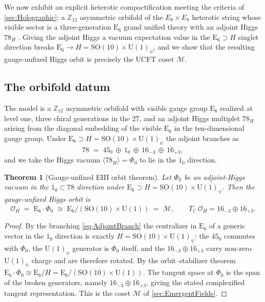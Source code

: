 \documentclass[pdflatex,sn-mathphys-num]{sn-jnl}
\theoremstyle{thmstyleone}
\newtheorem{theorem}{Theorem}
\theoremstyle{thmstyletwo}%
\theoremstyle{thmstylethree}%
\newcommand{\SO}[1]{\mathrm{SO(#1)}}
\newcommand{\U}[1]{\mathrm{U(#1)}}
\newcommand{\E}[1]{\mathrm{E_{#1}}}
\newcommand{\M}{\mathcal{M}}
\newcommand{\SOTen}{\SO{10}}
\newcommand{\UOne}{\U{1}}
\newcommand{\ESix}{\E{6}}
\newcommand{\SOTenXUOne}{\SOTen \times \UOne}
\newcommand{\MCosetInline}{\ESix/(\SOTenXUOne)}
\begin{document}
We now exhibit an explicit heterotic compactification meeting the criteria of
\autoref{sec:Holographic}: a $\mathbb Z_{12}$ asymmetric orbifold of the
$E_{8}\times E_{8}$ heterotic string \cite{DHVW:1985,Narain:1986} whose visible
sector is a three-generation $\ESix$ grand unified theory with an adjoint Higgs
$78_{H}$ \cite{Z12Heterotic}.  Giving the adjoint Higgs a vacuum expectation
value in the $\ESix\supset H$ singlet direction breaks $\ESix\to H=\SOTenXUOne_\psi$,
and we show that the resulting gauge-unfixed Higgs orbit is precisely the UCFT
coset $\M$.

\subsection{The orbifold datum}

The model is a $\mathbb Z_{12}$ asymmetric orbifold with visible gauge group
$\ESix$ realized at level one, three chiral generations in the $27$, and an
adjoint Higgs multiplet $78_{H}$ arising from the diagonal embedding of the
visible $\ESix$ in the ten-dimensional gauge group.  Under
$\ESix\supset H=\SOTenXUOne_\psi$ the adjoint branches as
\begin{equation}
  78 \;=\; 45_{0}\,\oplus\,1_{0}\,\oplus\,16_{-3}\,\oplus\,\overline{16}_{+3},
  \label{eq:AdjointBranch}
\end{equation}
and we take the Higgs vacuum $\langle78_{H}\rangle=\Phi_{0}$ to lie in the
$1_{0}$ direction.

\begin{theorem}[Gauge-unfixed EIII orbit theorem]
\label{thm:Z12Orbit}
Let $\Phi_{0}$ be an adjoint-Higgs vacuum in the $1_{0}\subset78$ direction under
$\ESix\supset H=\SOTenXUOne_\psi$.  Then the gauge-unfixed Higgs orbit is
\[
  \mathcal O_{H}
  \;=\;\ESix\cdot\Phi_{0}
  \;\cong\;\MCosetInline
  \;=\;\M,
  \qquad
  T_{\mathbb C}\,\mathcal O_{H}=16_{-3}\oplus\overline{16}_{+3}.
\]
\end{theorem}

\begin{proof}
By the branching \eqref{eq:AdjointBranch} the centralizer in $\ESix$ of a
generic vector in the $1_{0}$ direction is exactly $H=\SOTenXUOne_\psi$: the
$45_{0}$ commutes with $\Phi_{0}$, the $\UOne_\psi$ generator is $\Phi_{0}$
itself, and the $16_{-3}\oplus\overline{16}_{+3}$ carry non-zero $\UOne_\psi$
charge and are therefore rotated.  By the orbit--stabilizer theorem
$\ESix\cdot\Phi_{0}\cong\ESix/H=\MCosetInline$.  The tangent space at $\Phi_{0}$
is the span of the broken generators, namely
$16_{-3}\oplus\overline{16}_{+3}$, giving the stated complexified tangent
representation.  This is the coset $\M$ of \autoref{sec:EmergentFields}.
\end{proof}
\end{document}
